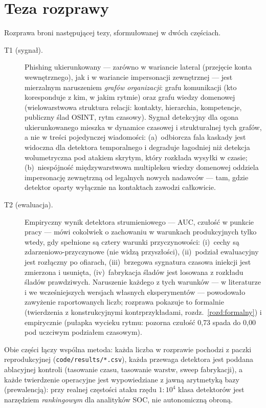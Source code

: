 \section{Teza rozprawy}
\label{sec:w-teza}

Rozprawa broni następującej tezy, sformułowanej w dwóch częściach.

\begin{description}
\item[T1 (sygnał).] Phishing ukierunkowany --- zarówno w wariancie lateral
(przejęcie konta wewnętrznego), jak i w wariancie impersonacji
zewnętrznej --- jest mierzalnym naruszeniem \emph{grafów organizacji}:
grafu komunikacji (kto koresponduje z kim, w jakim rytmie) oraz grafu
wiedzy domenowej (wielowarstwowa struktura relacji: kontakty,
hierarchia, kompetencje, publiczny ślad OSINT, rytm czasowy). Sygnał
detekcyjny dla ogona ukierunkowanego mieszka w dynamice czasowej i
strukturalnej tych grafów, a nie w treści pojedynczej wiadomości:
(a)~odbiorcza fala kaskady jest widoczna dla detektora temporalnego
i degraduje łagodniej niż detekcja wolumetryczna pod atakiem skrytym,
który rozkłada wysyłki w czasie; (b)~niespójność międzywarstwowa
multipleksu wiedzy domenowej oddziela impersonację zewnętrzną od
legalnych nowych nadawców --- tam, gdzie detektor oparty wyłącznie na
kontaktach zawodzi całkowicie.
\item[T2 (ewaluacja).] Empiryczny wynik detektora strumieniowego --- AUC,
czułość w punkcie pracy --- mówi cokolwiek o zachowaniu w warunkach
produkcyjnych tylko wtedy, gdy spełnione są cztery warunki
przyczynowości: (i)~cechy są zdarzeniowo-przyczynowe (nie widzą
przyszłości), (ii)~podział ewaluacyjny jest rozłączny po ofiarach,
(iii)~brzegowa sygnatura czasowa iniekcji jest zmierzona i usunięta,
(iv)~fabrykacja śladów jest losowana z rozkładu śladów prawdziwych.
Naruszenie każdego z tych warunków --- w literaturze i we wcześniejszych
wersjach własnych eksperymentów --- powodowało zawyżenie raportowanych liczb; rozprawa
pokazuje to formalnie (twierdzenia z konstrukcyjnymi kontrprzykładami,
rozdz.~\ref{rozd:formalny}) i empirycznie (pułapka wycieku rytmu:
pozorna czułość 0{,}73 spada do 0{,}00 pod uczciwym podziałem
czasowym).
\end{description}

Obie części łączy wspólna metoda: każda liczba w rozprawie pochodzi
z paczki reprodukcyjnej (\texttt{code/results/*.csv}), każda przewaga
detektora jest poddana ablacyjnej kontroli (tasowanie czasu, tasowanie
warstw, sweep fabrykacji), a każde twierdzenie operacyjne jest
wypowiedziane z jawną arytmetyką bazy (prewalencją): przy realnej
częstości ataku rzędu $1{:}10^4$ klasa detektorów jest narzędziem
\emph{rankingowym} dla analityków SOC, nie autonomiczną obroną.

